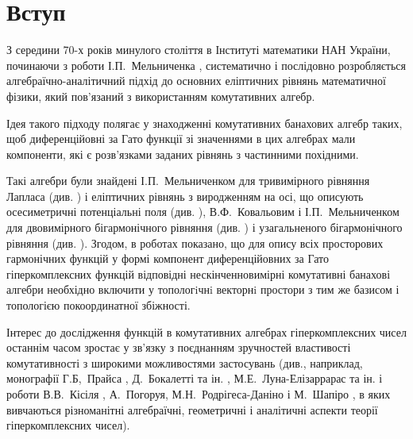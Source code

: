 \documentclass[11pt, reqno]{amsart}
\begin{document}



\maketitle


\section{Вступ}\label{1sec1}


З середини 70-х років минулого століття в Інституті математики НАН
України, починаючи з роботи І.П.~Мельниченка \cite{Mel'nichenko75},
систематично і послідовно розробляється
алгебраїчно-аналітичний підхід до основних еліптичних рівнянь
математичної фізики, який пов'язаний з використанням комутативних
алгебр.

Ідея такого підходу полягає у знаходженні комутативних
банахових алгебр таких, щоб диференційовні за Гато
функції зі значеннями в цих алгебрах мали компоненти, які є
розв'язками заданих рівнянь з частинними похідними.

Такі алгебри були знайдені І.П.~Мельниченком для
тривимірного рівняння Лапласа (див.
\cite{Mel'nichenko75,Mel'nichenko03,Mel-Plaksa}) і еліптичних
рівнянь з виродженням на осі, що описують осесиметричні
потенціальні поля (див. \cite{M2,Mel-Plaksa}), В.Ф.~Ковальовим і
І.П.~Мельниченком для двовимірного бігармонічного рівняння (див.
\cite{Kov-Mel,Mel'nichenko86}) і узагальненого бігармонічного
рівняння (див. \cite{Kov-Mel-pr91}).
Згодом, в роботах \cite{Pl-Zb-2013,Pla-Shp-Bull-2012} показано, що для опису всіх просторових гармонічних функцій
у формі компонент диференційовних за Гато гіперкомплексних функцій
відповідні нескінченновимірні комутативні банахові
алгебри необхідно включити у топологiчнi векторнi простори з тим же базисом і топологією покоординатної збіжності.


Інтерес до дослідження функцій в комутативних алгебрах
гіперкомплексних чисел останнім часом зростає у зв'язку з
поєднанням зручностей властивості комутативності з широкими
можливостями застосувань (див., наприклад, монографії
Г.Б,~Прайса \cite{Price}, Д.~Бокалетті та ін. \cite{Boc-Cat}, М.Е.~Луна-Елізаррарас та ін. \cite{Luna-Shapiro-Struppa}
і роботи В.В.~Кісіля \cite{Kisil12,Kisil2-12}, А.~Погоруя, М.Н.~Родрігеса-Даніно і М.~Шапіро \cite{Pogor-Ramon-Shap},
в яких вивчаються різноманітні алгебраїчні, геометричні і
аналітичні аспекти теорії гіперкомплексних чисел).
\end{document}
